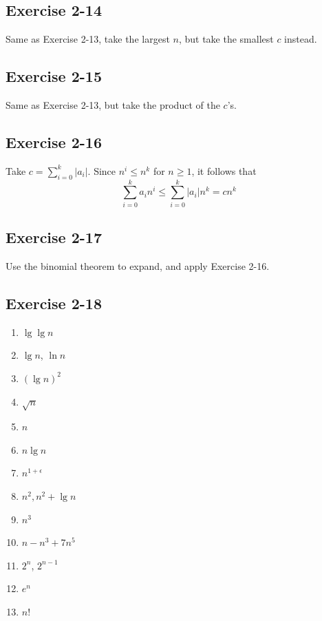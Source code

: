 \documentclass{book}
\begin{document}
\subsection*{Exercise 2-14}
Same as Exercise 2-13, take the largest $n$, but take the smallest $c$ instead.

\subsection*{Exercise 2-15}
Same as Exercise 2-13, but take the product of the $c$'s.

\subsection*{Exercise 2-16}
Take $c = \sum_{i = 0}^k |a_i|$. Since $n^i \leq n^k$ for $n \geq 1$, it follows that
$$\sum_{i = 0}^k a_i n^i \leq \sum_{i = 0}^k |a_i| n^k = cn^k$$

\subsection*{Exercise 2-17}
Use the binomial theorem to expand, and apply Exercise 2-16.

\subsection*{Exercise 2-18}
\begin{enumerate}
    \item $\lg \lg n$
    \item $\lg n$, $\ln n$
    \item $(\lg n)^2$
    \item $\sqrt{n}$
    \item $n$
    \item $n \lg n$
    \item $n^{1 + \epsilon}$
    \item $n^2, n^2 + \lg n$
    \item $n^3$
    \item $n - n^3 + 7n^5$
    \item $2^n$, $2^{n - 1}$
    \item $e^n$
    \item $n!$
\end{enumerate}
\end{document}

